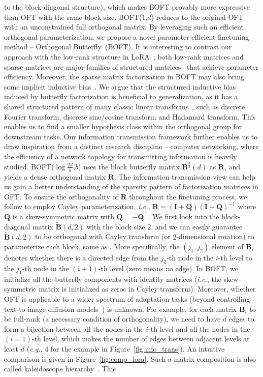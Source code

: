 to the block-diagonal structure), which makes BOFT provably more expressive than OFT with the same block size. BOFT($1$,$d$) reduces to the original OFT~\cite{qiu2023controlling} with an unconstrained full orthogonal matrix. By leveraging such an efficient orthogonal parameterization, we propose a novel parameter-efficient finetuning method -- Orthogonal Butterfly~(BOFT). It is interesting to   contrast our approach with the low-rank structure in LoRA~\cite{hulora2022};  both low-rank matrices and sparse matrices are major families of structured matrices~\cite{candes2011robust} that achieve parameter efficiency. Moreover, the sparse matrix factorization in BOFT may also bring some implicit inductive bias~\cite{gunasekar2017implicit,li2018algorithmic,liu2019neural}. We argue that the structured inductive bias induced by butterfly factorization is beneficial to generalization, as it has a shared structured pattern of many classic linear transforms~\cite{dao2019kaleidoscope}, such as discrete Fourier transform, discrete sine/cosine transform and Hadamard transform. This enables us to find a smaller hypothesis class within the orthogonal group for downstream tasks. Our information transmission framework further enables us to draw inspiration from a distinct research discipline -- computer networking, where the efficiency of a network topology for transmitting information is heavily studied. BOFT($\log \frac{2d}{b}$,$b$) uses the block butterfly matrix $\bm{B}^{\frac{b}{2}}(d)$ as $\bm{R}$, and yields a dense orthogonal matrix $\bm{R}$. The information transmission view can help us gain a better understanding of the sparsity pattern of factorization matrices in OFT. To ensure the orthogonality of $\bm{R}$ throughout the finetuning process, we follow \cite{qiu2023controlling,liu2021orthogonal} to employ Cayley parameterization, \emph{i.e.}, $\bm{R}=(\bm{I}+\bm{Q})(\bm{I}-\bm{Q})^{-1}$ where $\bm{Q}$ is a skew-symmetric matrix with $\bm{Q}=-\bm{Q}^\top$. We first look into the block-diagonal matrix $\tilde{\bm{B}}(d,2)$ with the block size $2$, and we can easily guarantee $\tilde{\bm{B}}(d,2)$ to be orthogonal with Cayley transform (or $2$-dimensional rotation) to parameterize each block, same as \cite{liu2021orthogonal,qiu2023controlling}. More specifically, the $(j_1,j_2)$ element of $\bm{B}_i$ denotes whether there is a directed edge from the $j_2$-th node in the $i$-th level to the $j_1$-th node in the $(i+1)$-th level (zero means no edge). In BOFT, we initialize all the butterfly components with identity matrices (\emph{i.e.}, the skew-symmetric matrix is initialized as zeros in Cayley transform). Moreover, whether OFT is applicable to a wider spectrum of adaptation tasks (beyond controlling text-to-image diffusion models~\cite{qiu2023controlling}) is unknown. For example, for each matrix $\bm{B}_i$ to be full-rank (a necessary condition of orthogonality), we need to have $d$ edges to form a bijection between all the nodes in the $i$-th level and all the nodes in the $(i=1)$-th level, which makes the number of edges between adjacent levels at least $d$ (\emph{e.g.}, 4 for the example in Figure~\ref{fig:info_trans}).  An intuitive comparison is given in Figure~\ref{fig:comp_lora}. Such a matrix composition is also called kaleidoscope hierarchy~\cite{dao2019kaleidoscope}. This 